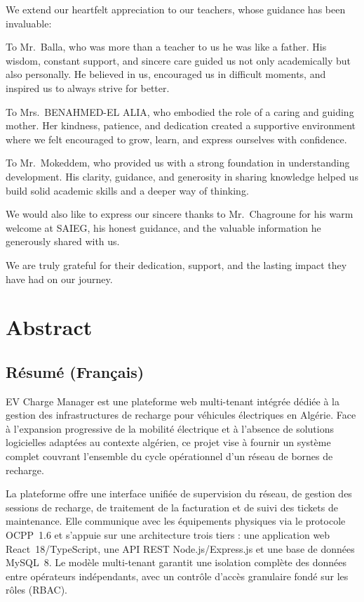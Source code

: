 \documentclass[12pt,a4paper]{report}
\begin{document}
We extend our heartfelt appreciation to our teachers, whose guidance has been invaluable:

To Mr.\ Balla, who was more than a teacher to us he was like a father. His wisdom, constant
support, and sincere care guided us not only academically but also personally. He believed in
us, encouraged us in difficult moments, and inspired us to always strive for better.

To Mrs.\ BENAHMED-EL ALIA, who embodied the role of a caring and guiding mother. Her kindness,
patience, and dedication created a supportive environment where we felt encouraged to grow,
learn, and express ourselves with confidence.

To Mr.\ Mokeddem, who provided us with a strong foundation in understanding development. His
clarity, guidance, and generosity in sharing knowledge helped us build solid academic skills
and a deeper way of thinking.

We would also like to express our sincere thanks to Mr.\ Chagroune for his warm welcome at
SAIEG, his honest guidance, and the valuable information he generously shared with us.

We are truly grateful for their dedication, support, and the lasting impact they have had on
our journey.

\chapter*{Abstract}

\section*{Résumé (Français)}

EV Charge Manager est une plateforme web multi-tenant intégrée dédiée à la gestion des
infrastructures de recharge pour véhicules électriques en Algérie. Face à l'expansion
progressive de la mobilité électrique et à l'absence de solutions logicielles adaptées au
contexte algérien, ce projet vise à fournir un système complet couvrant l'ensemble du cycle
opérationnel d'un réseau de bornes de recharge.

La plateforme offre une interface unifiée de supervision du réseau, de gestion des sessions
de recharge, de traitement de la facturation et de suivi des tickets de maintenance. Elle
communique avec les équipements physiques via le protocole OCPP~1.6 et s'appuie sur une
architecture trois tiers : une application web React~18/TypeScript, une API REST
Node.js/Express.js et une base de données MySQL~8. Le modèle multi-tenant garantit une
isolation complète des données entre opérateurs indépendants, avec un contrôle d'accès
granulaire fondé sur les rôles (RBAC).
\end{document}
